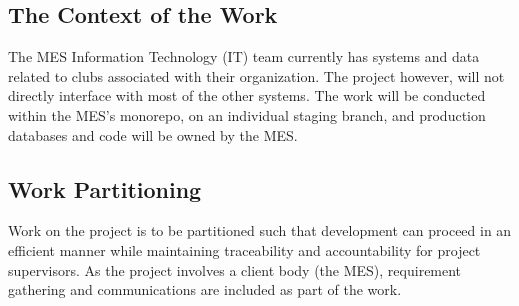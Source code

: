 \documentclass[12pt]{article}
\begin{document}
  \subsection{The Context of the Work}
    The MES Information Technology (IT) team currently has systems and data related to clubs associated
    with their organization. The project however, will not directly interface with most of the other systems.
    The work will be conducted within the MES's monorepo, on an individual staging branch, and production databases
    and code will be owned by the MES.

  \subsection{Work Partitioning}
    Work on the project is to be partitioned such that development can proceed in an efficient manner while
    maintaining traceability and accountability for project supervisors. As the project involves a client body (the MES),
    requirement gathering and communications are included as part of the work.
\end{document}
